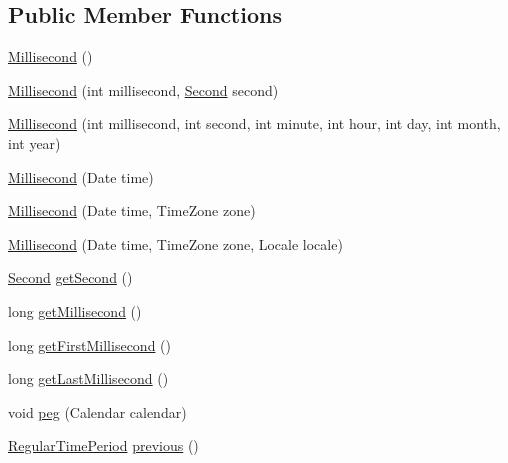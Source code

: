 \subsection*{Public Member Functions}
\begin{DoxyCompactItemize}
\item 
\mbox{\hyperlink{classorg_1_1jfree_1_1data_1_1time_1_1_millisecond_a71e74643c3321f1aa027e65881d130d1}{Millisecond}} ()
\item 
\mbox{\hyperlink{classorg_1_1jfree_1_1data_1_1time_1_1_millisecond_aa423097aa022dd945994f3cdeed093a2}{Millisecond}} (int millisecond, \mbox{\hyperlink{classorg_1_1jfree_1_1data_1_1time_1_1_second}{Second}} second)
\item 
\mbox{\hyperlink{classorg_1_1jfree_1_1data_1_1time_1_1_millisecond_a880826178c5444b9f784b301efa564e2}{Millisecond}} (int millisecond, int second, int minute, int hour, int day, int month, int year)
\item 
\mbox{\hyperlink{classorg_1_1jfree_1_1data_1_1time_1_1_millisecond_a7d54d297da1cde9cb1c4e601a8f8a65b}{Millisecond}} (Date time)
\item 
\mbox{\hyperlink{classorg_1_1jfree_1_1data_1_1time_1_1_millisecond_a2bff893aab6dfdc25693fbf954ac34da}{Millisecond}} (Date time, Time\+Zone zone)
\item 
\mbox{\hyperlink{classorg_1_1jfree_1_1data_1_1time_1_1_millisecond_a7a133f8dac8a73fdebd75dab39e4b0c2}{Millisecond}} (Date time, Time\+Zone zone, Locale locale)
\item 
\mbox{\hyperlink{classorg_1_1jfree_1_1data_1_1time_1_1_second}{Second}} \mbox{\hyperlink{classorg_1_1jfree_1_1data_1_1time_1_1_millisecond_ab8bececee0a01fcdfea0c7b1e76ee4ba}{get\+Second}} ()
\item 
long \mbox{\hyperlink{classorg_1_1jfree_1_1data_1_1time_1_1_millisecond_a49c4898f0ef6dda4c34af9752ad93097}{get\+Millisecond}} ()
\item 
long \mbox{\hyperlink{classorg_1_1jfree_1_1data_1_1time_1_1_millisecond_a1911c22a597714f32bf790aa1f358950}{get\+First\+Millisecond}} ()
\item 
long \mbox{\hyperlink{classorg_1_1jfree_1_1data_1_1time_1_1_millisecond_ac9a80b0e4405e3fdedf5bd1ba4f3460a}{get\+Last\+Millisecond}} ()
\item 
void \mbox{\hyperlink{classorg_1_1jfree_1_1data_1_1time_1_1_millisecond_ae9a69e2252d3319a76b4592798b9b1aa}{peg}} (Calendar calendar)
\item 
\mbox{\hyperlink{classorg_1_1jfree_1_1data_1_1time_1_1_regular_time_period}{Regular\+Time\+Period}} \mbox{\hyperlink{classorg_1_1jfree_1_1data_1_1time_1_1_millisecond_a85b788c782ac2db675113db03afa95ee}{previous}} ()

\end{DoxyCompactItemize}
